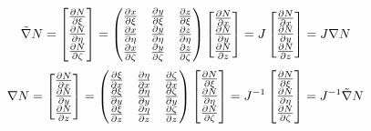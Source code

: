 \documentclass[11pt]{article}
\newcommand{\xxi}{\frac{\partial x}{\partial \xi}}
\newcommand{\yxi}{\frac{\partial y}{\partial \xi}}
\newcommand{\zxi}{\frac{\partial z}{\partial \xi}}
\newcommand{\xeta}{\frac{\partial x}{\partial \eta}}
\newcommand{\yeta}{\frac{\partial y}{\partial \eta}}
\newcommand{\zeeta}{\frac{\partial z}{\partial \eta}}
\newcommand{\xzeta}{\frac{\partial x}{\partial \zeta}}
\newcommand{\yzeta}{\frac{\partial y}{\partial \zeta}}
\newcommand{\zzeta}{\frac{\partial z}{\partial \zeta}}
\newcommand{\xix}{\frac{\partial \xi}{\partial x}}
\newcommand{\xiy}{\frac{\partial \xi}{\partial y}}
\newcommand{\xiz}{\frac{\partial \xi}{\partial z}}
\newcommand{\etax}{\frac{\partial \eta}{\partial x}}
\newcommand{\etay}{\frac{\partial \eta}{\partial y}}
\newcommand{\etaz}{\frac{\partial \eta}{\partial z}}
\newcommand{\zetax}{\frac{\partial \zeta}{\partial x}}
\newcommand{\zetay}{\frac{\partial \zeta}{\partial y}}
\newcommand{\zetaz}{\frac{\partial \zeta}{\partial z}}
\newcommand{\nx}{\frac{\partial N}{\partial x}}
\newcommand{\ny}{\frac{\partial N}{\partial y}}
\newcommand{\nz}{\frac{\partial N}{\partial z}}
\newcommand{\nxi}{\frac{\partial N}{\partial \xi}}
\newcommand{\neta}{\frac{\partial N}{\partial \eta}}
\newcommand{\nzeta}{\frac{\partial N}{\partial \zeta}}
\begin{document}
\begin{enumerate}
	
	\begin{equation*}
	\tilde{\nabla} N = 
	\left[
	\begin{array}{@{}c@{}}
	\nxi\\
	\neta\\
	\nzeta
	\end{array} 
	\right] = 
	\begin{pmatrix}
	\xxi & \yxi  & \zxi   \\
	\xeta & \yeta & \zeeta   \\
	\xzeta & \yzeta & \zzeta  
	\end{pmatrix} 
	\left[
	\begin{array}{@{}c@{}}
	\nx\\
	\ny\\
	\nz
	\end{array} 
	\right] = 
	J \left[
	\begin{array}{@{}c@{}}
	\nx\\
	\ny\\
	\nz
	\end{array} 
	\right] = J \nabla N
	\end{equation*} 
	\begin{equation*}
	\nabla N = 
	\left[
	\begin{array}{@{}c@{}}
	\nx\\
	\ny\\
	\nz
	\end{array} 
	\right] = 
	\begin{pmatrix}
	\xix & \etax  & \zetax   \\
	\xiy & \etay & \zetay   \\
	\xiz & \etaz & \zetaz  
	\end{pmatrix} 
	\left[
	\begin{array}{@{}c@{}}
	\nxi\\
	\neta\\
	\nzeta
	\end{array} 
	\right] = 
	J^{-1} 
	\left[
	\begin{array}{@{}c@{}}
	\nxi\\
	\neta\\
	\nzeta
	\end{array} 
	\right] = J^{-1} \tilde{\nabla}N
	\end{equation*}
	

\end{enumerate}
\end{document}
